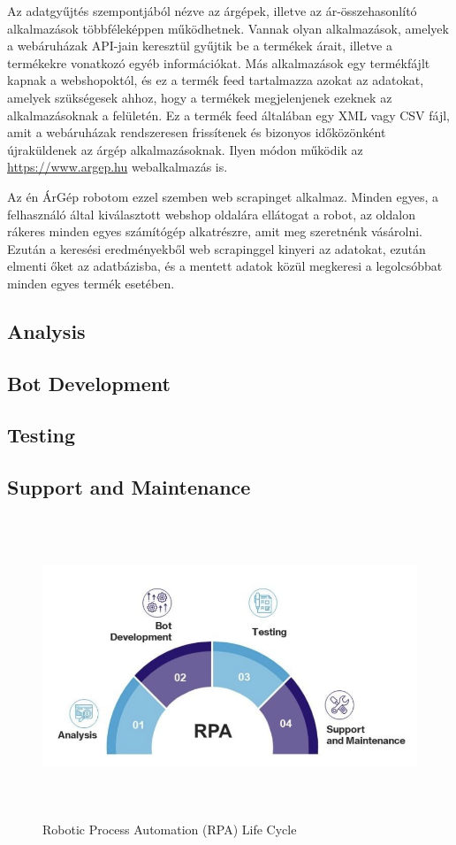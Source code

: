 \documentclass[
]{thesis-ekf}
\theoremstyle{definition}
\theoremstyle{remark}
\begin{document}
Az adatgyűjtés szempontjából nézve az árgépek, illetve az ár-összehasonlító alkalmazások többféleképpen működhetnek. Vannak olyan alkalmazások, amelyek a webáruházak API-jain keresztül gyűjtik be a termékek árait, illetve a termékekre vonatkozó egyéb információkat. 
Más alkalmazások egy termékfájlt kapnak a webshopoktól, és ez a termék feed tartalmazza azokat az adatokat, amelyek szükségesek ahhoz, hogy a termékek megjelenjenek ezeknek az alkalmazásoknak a felületén. Ez a termék feed általában egy XML vagy CSV fájl, amit a webáruházak rendszeresen frissítenek és bizonyos időközönként újraküldenek az árgép alkalmazásoknak. Ilyen módon működik az \url{https://www.argep.hu} webalkalmazás is.

Az én ÁrGép robotom ezzel szemben web scrapinget alkalmaz. Minden egyes, a felhasználó által kiválasztott webshop oldalára ellátogat a robot, az oldalon rákeres minden egyes számítógép alkatrészre, amit meg szeretnénk vásárolni. Ezután a keresési eredményekből web scrapinggel kinyeri az adatokat, ezután elmenti őket az adatbázisba, és a mentett adatok közül megkeresi a legolcsóbbat minden egyes termék esetében.

\subsection{Analysis}
\subsection{Bot Development}
\subsection{Testing}
\subsection{Support and Maintenance}

\begin{figure}[!ht]
	\centering
		\includegraphics[width=15cm, height=9cm]{rpa lifecycle}
	\caption{Robotic Process Automation (RPA) Life Cycle}
	\label{picture-ExcelDataLoader}
\end{figure}
\end{document}
